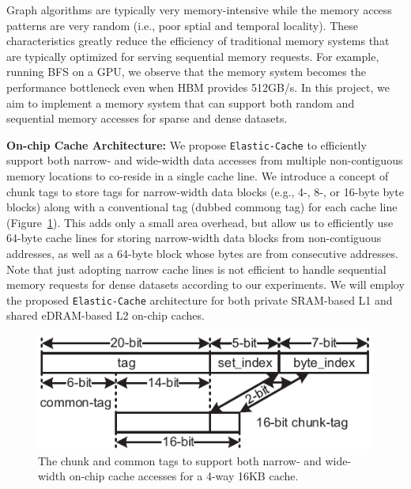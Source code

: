 \noindent
Graph algorithms are typically very memory-intensive while the memory access patterns are very random (i.e., poor sptial and temporal locality). 
These characteristics greatly reduce the efficiency of traditional memory systems that are typically optimized for serving sequential memory requests. 
For example, running BFS on a GPU, we observe that the memory system becomes the performance bottleneck even when HBM provides 512GB/s. 
In this project, we aim to implement a memory system that can support both random and sequential memory accesses for sparse and dense datasets.

\noindent
\textbf{On-chip Cache Architecture:} 
We propose \texttt{Elastic-Cache} to efficiently support both narrow- and wide-width data accesses from multiple non-contiguous memory locations to co-reside in a single cache line. 
We introduce a concept of chunk tags to store tags for narrow-width data blocks (e.g., 4-, 8-, or 16-byte byte blocks) along with a conventional tag (dubbed commong tag) for each cache line (Figure~\ref{fig:elastic-cache}). 
This adds only a small area overhead, but allow us to efficiently use 64-byte cache lines for storing narrow-width data blocks from non-contiguous addresses, as well as a 64-byte block whose bytes are from consecutive addresses.
Note that just adopting narrow cache lines is not efficient to handle sequential memory requests for dense datasets according to our experiments.
We will employ the proposed \texttt{Elastic-Cache} architecture for both private SRAM-based L1 and shared eDRAM-based L2 on-chip caches.


\begin{figure}
\center
\includegraphics[width=1.0\linewidth]{./fig/chunk_tag_16bit-eps-converted-to.pdf}
\caption{The chunk and common tags to support both narrow- and wide-width on-chip cache accesses for a 4-way 16KB cache.}
\label{fig:elastic-cache}
\end{figure}


